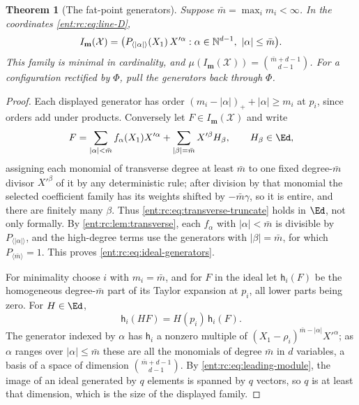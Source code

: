 \documentclass[11pt]{article}
\newtheorem{theorem}{Theorem}[section]
\theoremstyle{plain}
\theoremstyle{plain}
\theoremstyle{plain}
\theoremstyle{definition}
\theoremstyle{definition}
\theoremstyle{definition}
\theoremstyle{definition}
\theoremstyle{remark}
\begin{document}
\begin{theorem}[The fat-point generators]\label{ent:rc:thm:fat-generators}
Suppose $\bar m=\max_im_i<\infty$. In the coordinates \eqref{ent:rc:eq:line-D},
\begin{equation}\label{ent:rc:eq:ideal-generators}
 I_{\mathbf m}(\mathcal X)=\bigl(P_{\langle|\alpha|\rangle}(X_1)\,X'^\alpha:
 \alpha\in\mathbb N^{d-1},\ |\alpha|\le\bar m\bigr).
\end{equation}
This family is minimal in cardinality, and
$\mu(I_{\mathbf m}(\mathcal X))=\binom{\bar m+d-1}{d-1}$. For a configuration
rectified by $\Phi$, pull the generators back through $\Phi$.
\end{theorem}
\begin{proof}
Each displayed generator has order $(m_i-|\alpha|)_++|\alpha|\ge m_i$ at
$p_i$, since orders add under products. Conversely let $F\in
I_{\mathbf m}(\mathcal X)$ and write
\begin{equation}\label{ent:rc:eq:transverse-truncate}
 F=\sum_{|\alpha|<\bar m}f_\alpha(X_1)X'^\alpha
 +\sum_{|\beta|=\bar m}X'^\beta H_\beta,\qquad H_\beta\in\Ed ,
\end{equation}
assigning each monomial of transverse degree at least $\bar m$ to one fixed
degree-$\bar m$ divisor $X'^\beta$ of it by any deterministic rule; after
division by that monomial the selected coefficient family has its weights
shifted by $-\bar m\gamma$, so it is entire, and there are finitely many
$\beta$. Thus \eqref{ent:rc:eq:transverse-truncate} holds in $\Ed$, not only
formally. By \cref{ent:rc:lem:transverse}, each $f_\alpha$ with
$|\alpha|<\bar m$ is divisible by $P_{\langle|\alpha|\rangle}$, and the
high-degree terms use the generators with $|\beta|=\bar m$, for which
$P_{\langle\bar m\rangle}=1$. This proves \eqref{ent:rc:eq:ideal-generators}.

For minimality choose $i$ with $m_i=\bar m$, and for $F$ in the ideal let
$\mathsf h_i(F)$ be the homogeneous degree-$\bar m$ part of its Taylor
expansion at $p_i$, all lower parts being zero. For $H\in\Ed$,
\begin{equation}\label{ent:rc:eq:leading-module}
 \mathsf h_i(HF)=H(p_i)\,\mathsf h_i(F).
\end{equation}
The generator indexed by $\alpha$ has $\mathsf h_i$ a nonzero multiple of
$(X_1-\rho_i)^{\bar m-|\alpha|}X'^\alpha$; as $\alpha$ ranges over
$|\alpha|\le\bar m$ these are all the monomials of degree $\bar m$ in $d$
variables, a basis of a space of dimension $\binom{\bar m+d-1}{d-1}$. By
\eqref{ent:rc:eq:leading-module}, the image of an ideal generated by $q$
elements is spanned by $q$ vectors, so $q$ is at least that dimension, which is
the size of the displayed family.
\end{proof}
\end{document}
